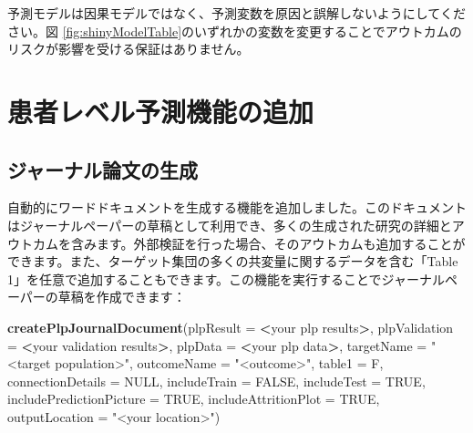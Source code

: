 \documentclass[
  11pt]{book}
\makeatletter
\newenvironment{Shaded}{\begin{snugshade}}{\end{snugshade}}
\newcommand{\AttributeTok}[1]{\textcolor[rgb]{0.13,0.29,0.53}{#1}}
\newcommand{\ConstantTok}[1]{\textcolor[rgb]{0.56,0.35,0.01}{#1}}
\newcommand{\FunctionTok}[1]{\textcolor[rgb]{0.13,0.29,0.53}{\textbf{#1}}}
\newcommand{\NormalTok}[1]{#1}
\newcommand{\SpecialCharTok}[1]{\textcolor[rgb]{0.81,0.36,0.00}{\textbf{#1}}}
\newcommand{\StringTok}[1]{\textcolor[rgb]{0.31,0.60,0.02}{#1}}
\newenvironment{kframe}{%
\medskip{}
\setlength{\fboxsep}{.8em}
 \def\at@end@of@kframe{}%
 \ifinner\ifhmode%
  \def\at@end@of@kframe{\end{minipage}}%
  \begin{minipage}{\columnwidth}%
 \fi\fi%
 \def\FrameCommand##1{\hskip\@totalleftmargin \hskip-\fboxsep
 \colorbox{myShadeColor}{##1}\hskip-\fboxsep
     \hskip-\linewidth \hskip-\@totalleftmargin \hskip\columnwidth}%
 \MakeFramed {\advance\hsize-\width
   \@totalleftmargin\z@ \linewidth\hsize
   \@setminipage}}%
 {\par\unskip\endMakeFramed%
 \at@end@of@kframe}
\newenvironment{rmdblock}[1]
  {
  \begin{itemize}
  \renewcommand{\labelitemi}{
    \raisebox{-.7\height}[0pt][0pt]{
      {\setkeys{Gin}{width=3em,keepaspectratio}\texttt{[image: images/\#1]}}
    }
  }
  \setlength{\fboxsep}{1em}
  \begin{kframe}
  \item
  }
  {
  \end{kframe}
  \end{itemize}
  }
\newenvironment{rmdimportant}
  {\begin{rmdblock}{important}}
  {\end{rmdblock}}
\theoremstyle{definition}
\theoremstyle{definition}
\theoremstyle{definition}
\theoremstyle{definition}
\theoremstyle{remark}
\makeatother
\begin{document}
\begin{rmdimportant}
予測モデルは因果モデルではなく、予測変数を原因と誤解しないようにしてください。図 \ref{fig:shinyModelTable}のいずれかの変数を変更することでアウトカムのリスクが影響を受ける保証はありません。
\end{rmdimportant}

\section{患者レベル予測機能の追加}\label{ux60a3ux8005ux30ecux30d9ux30ebux4e88ux6e2cux6a5fux80fdux306eux8ffdux52a0}

\subsection{ジャーナル論文の生成}\label{ux30b8ux30e3ux30fcux30caux30ebux8ad6ux6587ux306eux751fux6210}

自動的にワードドキュメントを生成する機能を追加しました。このドキュメントはジャーナルペーパーの草稿として利用でき、多くの生成された研究の詳細とアウトカムを含みます。外部検証を行った場合、そのアウトカムも追加することができます。また、ターゲット集団の多くの共変量に関するデータを含む「Table 1」を任意で追加することもできます。この機能を実行することでジャーナルペーパーの草稿を作成できます：

\begin{Shaded}
\begin{Highlighting}[]
 \FunctionTok{createPlpJournalDocument}\NormalTok{(}\AttributeTok{plpResult =} \SpecialCharTok{\textless{}}\NormalTok{your plp results}\SpecialCharTok{\textgreater{}}\NormalTok{,}
             \AttributeTok{plpValidation =} \SpecialCharTok{\textless{}}\NormalTok{your validation results}\SpecialCharTok{\textgreater{}}\NormalTok{,}
             \AttributeTok{plpData =} \SpecialCharTok{\textless{}}\NormalTok{your plp data}\SpecialCharTok{\textgreater{}}\NormalTok{,}
             \AttributeTok{targetName =} \StringTok{"\textless{}target population\textgreater{}"}\NormalTok{,}
             \AttributeTok{outcomeName =} \StringTok{"\textless{}outcome\textgreater{}"}\NormalTok{,}
             \AttributeTok{table1 =}\NormalTok{ F,}
             \AttributeTok{connectionDetails =} \ConstantTok{NULL}\NormalTok{,}
             \AttributeTok{includeTrain =} \ConstantTok{FALSE}\NormalTok{,}
             \AttributeTok{includeTest =} \ConstantTok{TRUE}\NormalTok{,}
             \AttributeTok{includePredictionPicture =} \ConstantTok{TRUE}\NormalTok{,}
             \AttributeTok{includeAttritionPlot =} \ConstantTok{TRUE}\NormalTok{,}
             \AttributeTok{outputLocation =} \StringTok{"\textless{}your location\textgreater{}"}\NormalTok{)}
\end{Highlighting}
\end{Shaded}
\end{document}
